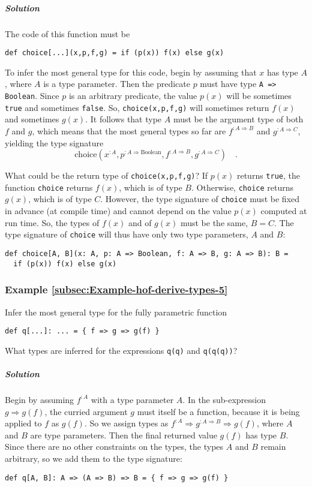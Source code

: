 \subparagraph{Solution}

The code of this function must be
\begin{lstlisting}
def choice[...](x,p,f,g) = if (p(x)) f(x) else g(x)
\end{lstlisting}
To infer the most general type for this code, begin by assuming that
$x$ has type $A$, where $A$ is a type parameter. Then the predicate
$p$ must have type \lstinline!A => Boolean!. Since $p$ is an arbitrary
predicate, the value $p(x)$ will be sometimes \lstinline!true! and
sometimes \lstinline!false!. So, \lstinline!choice(x,p,f,g)! will
sometimes return $f(x)$ and sometimes $g(x)$. It follows that type
$A$ must be the argument type of both $f$ and $g$, which means
that the most general types so far are $f^{:A\Rightarrow B}$ and
$g^{:A\Rightarrow C}$, yielding the type signature
\[
\text{choice}(x^{:A},p^{:A\Rightarrow\text{Boolean}},f^{:A\Rightarrow B},g^{:A\Rightarrow C})\quad.
\]

What could be the return type of \lstinline!choice(x,p,f,g)!? If
$p(x)$ returns \lstinline!true!, the function \lstinline!choice!
returns $f(x)$, which is of type $B$. Otherwise, \lstinline!choice!
returns $g(x)$, which is of type $C$. However, the type signature
of \lstinline!choice! must be fixed in advance (at compile time)
and cannot depend on the value $p(x)$ computed at run time. So, the
types of $f(x)$ and of $g(x)$ must be the same, $B=C$. The type
signature of \lstinline!choice! will thus have only two type parameters,
$A$ and $B$:
\begin{lstlisting}
def choice[A, B](x: A, p: A => Boolean, f: A => B, g: A => B): B =
  if (p(x)) f(x) else g(x)
\end{lstlisting}


\subsubsection{Example \label{subsec:Example-hof-derive-types-5}\ref{subsec:Example-hof-derive-types-5}}

Infer the most general type for the fully parametric function
\begin{lstlisting}
def q[...]: ... = { f => g => g(f) }
\end{lstlisting}
What types are inferred for the expressions \lstinline!q(q)! and
\lstinline!q(q(q))!?

\subparagraph{Solution}

Begin by assuming $f^{:A}$ with a type parameter $A$. In the sub-expression
$g\Rightarrow g(f)$, the curried argument $g$ must itself be a function,
because it is being applied to $f$ as $g(f)$. So we assign types
as $f^{:A}\Rightarrow g^{:A\Rightarrow B}\Rightarrow g(f)$, where
$A$ and $B$ are type parameters. Then the final returned value $g(f)$
has type $B$. Since there are no other constraints on the types,
the types $A$ and $B$ remain arbitrary, so we add them to the type
signature:
\begin{lstlisting}
def q[A, B]: A => (A => B) => B = { f => g => g(f) }
\end{lstlisting}

